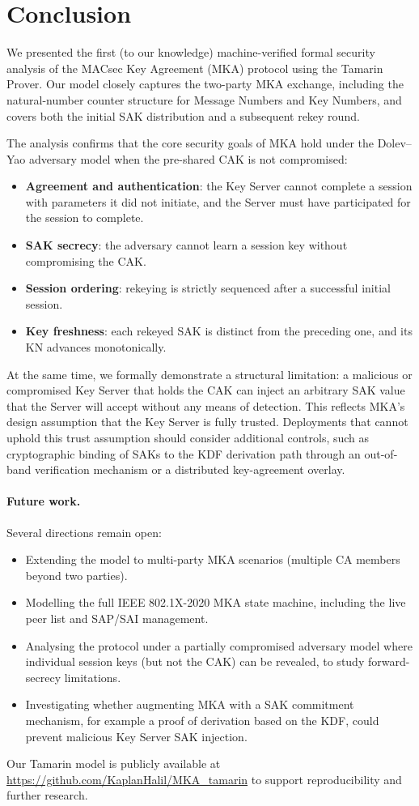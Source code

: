 \section{Conclusion}
\label{sec:conclusion}

We presented the first (to our knowledge) machine-verified formal security analysis of the MACsec Key Agreement (MKA) protocol using the Tamarin Prover. Our model closely captures the two-party MKA exchange, including the natural-number counter structure for Message Numbers and Key Numbers, and covers both the initial SAK distribution and a subsequent rekey round.

The analysis confirms that the core security goals of MKA hold under the Dolev--Yao adversary model when the pre-shared CAK is not compromised:
\begin{itemize}
  \item \textbf{Agreement and authentication}: the Key Server cannot complete a session with parameters it did not initiate, and the Server must have participated for the session to complete.
  \item \textbf{SAK secrecy}: the adversary cannot learn a session key without compromising the CAK.
  \item \textbf{Session ordering}: rekeying is strictly sequenced after a successful initial session.
  \item \textbf{Key freshness}: each rekeyed SAK is distinct from the preceding one, and its KN advances monotonically.
\end{itemize}

At the same time, we formally demonstrate a structural limitation: a malicious or compromised Key Server that holds the CAK can inject an arbitrary SAK value that the Server will accept without any means of detection. This reflects MKA's design assumption that the Key Server is fully trusted. Deployments that cannot uphold this trust assumption should consider additional controls, such as cryptographic binding of SAKs to the KDF derivation path through an out-of-band verification mechanism or a distributed key-agreement overlay.

\paragraph{Future work.} Several directions remain open:
\begin{itemize}
  \item Extending the model to multi-party MKA scenarios (multiple CA members beyond two parties).
  \item Modelling the full IEEE 802.1X-2020 MKA state machine, including the live peer list and SAP/SAI management.
  \item Analysing the protocol under a partially compromised adversary model where individual session keys (but not the CAK) can be revealed, to study forward-secrecy limitations.
  \item Investigating whether augmenting MKA with a SAK commitment mechanism, for example a proof of derivation based on the KDF, could prevent malicious Key Server SAK injection.
\end{itemize}

Our Tamarin model is publicly available at \url{https://github.com/KaplanHalil/MKA_tamarin} to support reproducibility and further research.